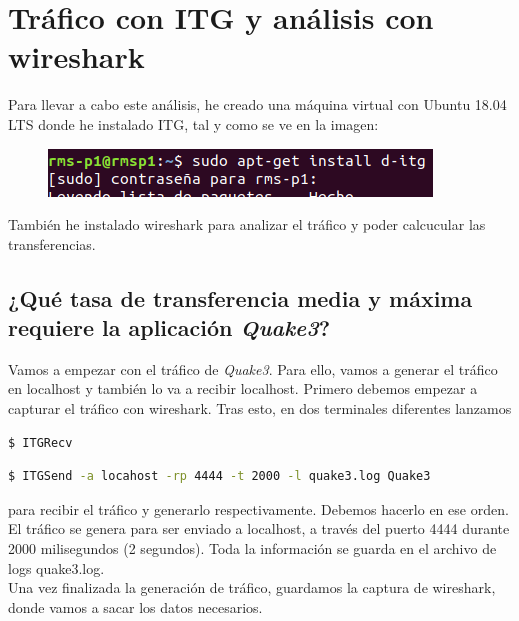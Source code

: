 \documentclass[11pt,a4paper]{article}
\begin{document}
\newpage

\section{Tráfico con ITG y análisis con wireshark}

Para llevar a cabo este análisis, he creado una máquina virtual con Ubuntu 18.04 LTS donde he instalado ITG, tal y como se ve en la imagen:

\begin{figure}[H]
	\centering
	\includegraphics[scale=1.0]{img/d-itg-install.png}
\end{figure}

También he instalado wireshark para analizar el tráfico y poder calcucular las transferencias.

\subsection{¿Qué tasa de transferencia media y máxima requiere la aplicación \textit{Quake3}?}

Vamos a empezar con el tráfico de \textit{Quake3}. Para ello, vamos a generar el tráfico en localhost y también lo va a recibir localhost. Primero debemos empezar a capturar el tráfico con wireshark. Tras esto, en dos terminales diferentes lanzamos\\

\begin{lstlisting}[language=bash,caption={Recibir el tráfico},captionpos=b]
$ ITGRecv
\end{lstlisting}

\begin{lstlisting}[language=bash,caption={General el tráfico},captionpos=b]
$ ITGSend -a locahost -rp 4444 -t 2000 -l quake3.log Quake3
\end{lstlisting}

para recibir el tráfico y generarlo respectivamente. Debemos hacerlo en ese orden. El tráfico se genera para ser enviado a localhost, a través del puerto 4444 durante 2000 milisegundos (2 segundos). Toda la información se guarda en el archivo de logs quake3.log.\\

Una vez finalizada la generación de tráfico, guardamos la captura de wireshark, donde vamos a sacar los datos necesarios.\\
\end{document}
